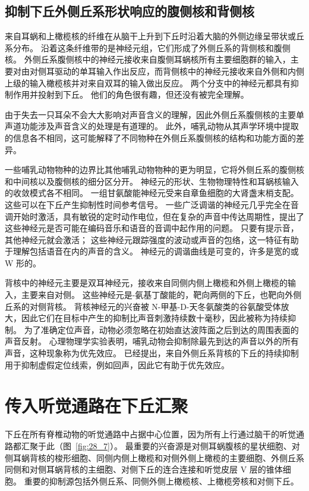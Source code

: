 \subsection{抑制下丘外侧丘系形状响应的腹侧核和背侧核}

来自耳蜗和上橄榄核的纤维在从脑干上升到下丘时沿着大脑的外侧边缘呈带状或丘系分布。
沿着这条纤维带的是神经元组，它们形成了外侧丘系的背侧核和腹侧核。
外侧丘系腹侧核中的神经元接收来自腹侧耳蜗核所有主要细胞群的输入，主要对由对侧耳驱动的单耳输入作出反应，而背侧核中的神经元接收来自外侧和内侧上级的输入橄榄核并对来自双耳的输入做出反应。
两个分支中的神经元都具有抑制作用并投射到下丘。
他们的角色很有趣，但还没有被完全理解。


由于失去一只耳朵不会大大影响对声音含义的理解，因此外侧丘系腹侧核的主要单声道功能涉及声音含义的处理是有道理的。
此外，哺乳动物从其声学环境中提取的信息各不相同，这可能解释了不同物种在外侧丘系腹侧核的结构和功能方面的差异。


一些哺乳动物物种的边界比其他哺乳动物物种的更为明显，它将外侧丘系的腹侧核和中间核以及腹侧核的细分区分开。
神经元的形状、生物物理特性和耳蜗核输入的收敛模式各不相同。
一组甘氨酸能神经元受来自章鱼细胞的大肾盏末梢支配。 
这些可以在下丘产生抑制性时间参考信号。
一些广泛调谐的神经元几乎完全在音调开始时激活，具有敏锐的定时动作电位，但在复杂的声音中传达周期性，提出了这些神经元是否可能在编码音乐和语音的音调中起作用的问题。
只要有提示音，其他神经元就会激活； 
这些神经元跟踪强度的波动或声音的包络，这一特征有助于理解包括语音在内的声音的含义。
神经元的调谐曲线是可变的，许多是宽的或 W 形的。


背核中的神经元主要是双耳神经元，接收来自同侧内侧上橄榄和外侧上橄榄的输入，主要来自对侧。
这些神经元是\ce{$\gamma$}-氨基丁酸能的，靶向两侧的下丘，也靶向外侧丘系的对侧背核。
背核神经元的兴奋被 N-甲基-D-天冬氨酸类的谷氨酸受体放大，因此它们在目标中产生的抑制比声音刺激持续数十毫秒，因此被称为持续抑制。
为了准确定位声音，动物必须忽略在初始直达波阵面之后到达的周围表面的声音反射。
心理物理学实验表明，哺乳动物会抑制除最先到达的声音以外的所有声音，这种现象称为优先效应。
已经提出，来自外侧丘系背核的下丘的持续抑制用于抑制虚假定位线索，例如回声，因此它有助于优先效应。



\section{传入听觉通路在下丘汇聚}

下丘在所有脊椎动物的听觉通路中占据中心位置，因为所有上行通过脑干的听觉通路都汇聚于此（图~\ref{fig:28_7}）。
最重要的兴奋源是对侧耳蜗腹核的星状细胞、对侧耳蜗背核的梭形细胞、同侧内侧上橄榄和对侧外侧上橄榄的主要细胞、外侧丘系同侧和对侧耳蜗背核的主细胞、对侧下丘的连合连接和听觉皮层 V 层的锥体细胞。
重要的抑制源包括外侧丘系、同侧外侧上橄榄核、上橄榄旁核和对侧下丘。


